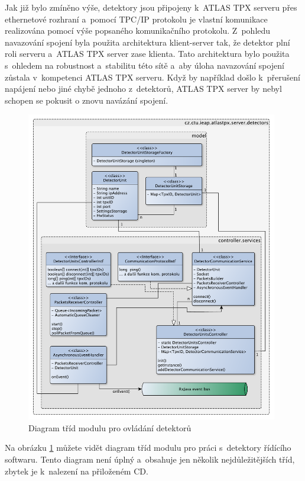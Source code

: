 Jak již bylo zmíněno výše, detektory jsou připojeny k~ATLAS TPX serveru přes ethernetové rozhraní a~pomocí TPC/IP protokolu je vlastní komunikace realizována pomocí výše popsaného komunikačního protokolu. Z~pohledu navazování spojení byla použita architektura klient-server tak, že detektor plní roli serveru a~ATLAS TPX server zase klienta. Tato architektura bylo použita s~ohledem na robustnost a~stabilitu této sítě a~aby úloha navazování spojení zůstala v~kompetenci ATLAS TPX serveru. Když by například došlo k~přerušení napájení nebo jiné chybě jednoho z~detektorů, ATLAS TPX server by nebyl schopen se pokusit o znovu navázání spojení.

\begin{figure}[th]
	\begin{center}
		\includegraphics[width=11cm]{figures/atlas_tpx_detectors_class.pdf}
		\caption{Diagram tříd modulu pro ovládání detektorů}
		\label{fig:class:detectors}
	\end{center}
\end{figure}

Na obrázku \ref{fig:class:detectors} můžete vidět diagram tříd modulu pro práci s~detektory řídícího softwaru. Tento diagram není úplný a~obsahuje jen několik nejdůležitějších tříd, zbytek je k~nalezení na přiloženém CD.

